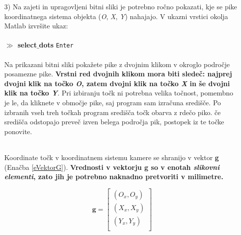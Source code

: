 \begin{enumerate}
\item[3)] Na zajeti in upragovljeni bitni sliki je potrebno ročno pokazati, kje se  %
pike koordinatnega sistema objekta (\emph{O}, \emph{X}, \emph{Y})  nahajajo. V ukazni vrstici okolja %
Matlab izvršite ukaz: \\ %
\vspace{-0.3cm}\\%
\textbf{$\gg$ select$\_$dots} \verb"Enter" \\ %
\vspace{-0.1cm}\\%
Na prikazani bitni sliki pokažete pike z dvojnim klikom v okroglo
področje posamezne pike. \textbf{Vrstni red dvojnih klikom mora biti sledeč:
najprej dvojni klik na  točko \emph{O}, zatem dvojni klik na točko \emph{X} in še dvojni klik na točko \emph{Y}}. Pri izbiranju točk ni potrebna velika točnost, %
pomembno je le, da kliknete v območje pike, saj program sam izračuna središče. Po izbranih %
vseh treh točkah program središča točk obarva z rdečo piko. če središča odstopajo preveč %
izven belega področja pik, postopek iz te točke ponovite. \\%
\\
\noindent %
\begin{mdframed}[backgroundcolor=blue!20, shadow=true,roundcorner=8pt]
        \vspace{0.1cm}
        Koordinate točk v koordinatnem sistemu kamere se shranijo v vektor \textbf{g} (Enačba \ref{eVektorG}). %
        \textbf{Vrednosti v vektorju g so v enotah %
        \emph{slikovni elementi}, zato jih je potrebno naknadno pretvoriti v milimetre.} %
        \vspace{0.1cm}
\end{mdframed}

\normalsize %
        \begin{equation}
            \textbf{g} =
            \begin{bmatrix}
                (O_x, O_y)  \\%
                (X_x, X_y)  \\%
                (Y_x, Y_y)  \\%
            \end{bmatrix}
            \label{eVektorG}
        \end{equation}
\vspace*{0.2cm} %



\end{enumerate}
